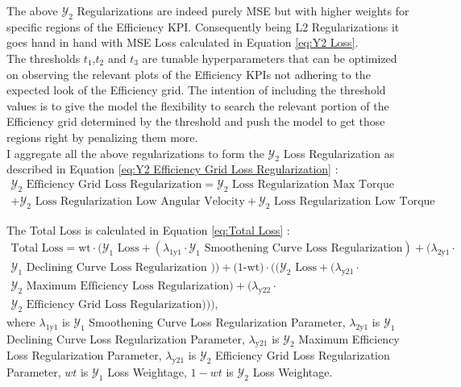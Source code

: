 \documentclass{report} %
\begin{document}
\begin{enumerate}
\begin{enumerate}
\end{enumerate}

The above $\mathcal{Y}_2$ Regularizations are indeed purely \ac{MSE} but with higher weights for specific regions of the Efficiency \ac{KPI}.
Consequently being L2 Regularizations it goes hand in hand with \ac{MSE} Loss calculated in Equation \ref{eq:Y2 Loss}.\\
The thresholds \(t_{1}\),\(t_{2}\) and \(t_{3}\) are tunable hyperparameters that can be optimized on observing the relevant plots of the Efficiency \ac{KPI}s 
not adhering to the expected look of the Efficiency grid. The intention of including the threshold values is to give the model the flexibility to search the relevant 
portion of the Efficiency grid determined by the threshold and push the model to get those regions right by penalizing them more.\\

I aggregate all the above regularizations to form the $\mathcal{Y}_2$ Loss Regularization as described in Equation \ref{eq:Y2 Efficiency Grid Loss Regularization} :
\begin{equation}
    \begin{split}
    \text{$\mathcal{Y}_2$ Efficiency Grid Loss Regularization} = \text{$\mathcal{Y}_2$ Loss Regularization Max Torque} \\
    + \text{$\mathcal{Y}_2$ Loss Regularization Low Angular Velocity} + \text{$\mathcal{Y}_2$ Loss Regularization Low Torque}
    \end{split}
    \label{eq:Y2 Efficiency Grid Loss Regularization}
\end{equation}

\end{enumerate}

The Total Loss is calculated in Equation \ref{eq:Total Loss} :
\begin{equation}
    \begin{split}
\text{Total Loss} = \text{wt} \cdot (\text{$\mathcal{Y}_1$ Loss} + (\lambda_{\text{1y1}} \cdot \text{$\mathcal{Y}_1$ Smoothening Curve Loss Regularization}) +  (\lambda_{\text{2y1}} \cdot \\
\text{$\mathcal{Y}_1$ Declining Curve Loss Regularization })) + \text{(1-wt)} \cdot ((\text{$\mathcal{Y}_2$ Loss} + (\lambda_{\text{y21}} \cdot \\ 
\text{$\mathcal{Y}_2$ Maximum Efficiency Loss Regularization}) + (\lambda_{\text{y22}} \cdot \\
\text{$\mathcal{Y}_2$ Efficiency Grid Loss Regularization}))),
    \end{split}
    \label{eq:Total Loss}
\end{equation}
where \(\lambda_{\text{1y1}}\) is $\mathcal{Y}_1$ Smoothening Curve Loss Regularization Parameter, \(\lambda_{\text{2y1}}\) is $\mathcal{Y}_1$ Declining Curve Loss Regularization Parameter,
        \(\lambda_{\text{y21}}\) is $\mathcal{Y}_2$ Maximum Efficiency Loss Regularization Parameter, \(\lambda_{\text{y21}}\) is $\mathcal{Y}_2$ Efficiency Grid Loss Regularization Parameter, 
        \(wt\) is $\mathcal{Y}_1$ Loss Weightage, \(1-wt\) is $\mathcal{Y}_2$ Loss Weightage. \\
\end{document}

